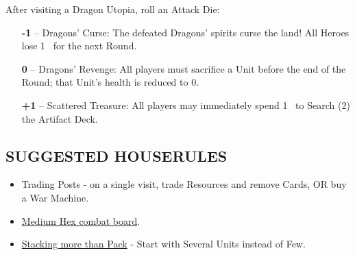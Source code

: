 \begin{multicols*}{2}
After visiting a Dragon Utopia, roll an Attack Die:
\begin{itemize}
  \item[\textbf{-1}] -- Dragons' Curse: The defeated Dragons’ spirits curse the land! All Heroes lose \mbox{1 } for the next Round.
  \item[\textbf{0}] -- Dragons' Revenge: All players must sacrifice a Unit before the end of the Round; that Unit's health is reduced to 0. 
  \item[ \textbf{+1}] -- Scattered Treasure: All players may immediately spend \mbox{1 } to Search (2) the Artifact Deck.
\end{itemize}

\subsection*{\MakeUppercase{Suggested Houserules}}
\begin{itemize}
  \item Trading Posts - on a single visit, trade Resources and remove Cards, OR buy a War Machine. %
  \item \href{https://boardgamegeek.com/thread/3445901/custom-hex-combat-board}{Medium Hex combat board}.
  \item \href{https://boardgamegeek.com/thread/3449937/houserule-for-stacking-more-than-pack}{Stacking more than Pack} - Start with Several  Units instead of Few.
\end{itemize}

\vspace*{\fill}

\end{multicols*}

